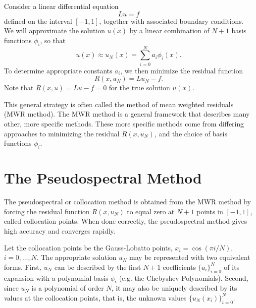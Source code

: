 \label{lab:pseudospectral1_revision}

Consider a linear differential equation
\begin{equation*}
	Lu = f
\end{equation*}
defined on the interval $[-1,1]$, together with associated boundary conditions.
We will approximate the solution $u(x)$ by a linear combination of $N+1$ basis functions $\phi_i$, so that
\begin{equation*}
	u(x) \approx u_N(x) = \sum_{i=0}^N a_i \phi_i(x).
\end{equation*}
To determine appropriate constants $a_i$, we then minimize the residual function
\begin{equation*}
	R(x,u_N) = Lu_N - f.
\end{equation*}
Note that $R(x,u) = Lu - f = 0$ for the true solution $u(x)$.

This general strategy is often called the method of mean weighted residuals (MWR method). 
The MWR method is a general framework that describes many other, more specific methods. 
These more specific methods come from differing approaches to minimizing the residual $R(x,u_N)$, and the choice of basis functions $\phi_i$.


\section*{The Pseudospectral Method}
The pseudospectral or collocation method is obtained from the MWR method by forcing the residual function $R(x,u_N)$ to equal zero at $N+1$ points in $[-1,1]$, called collocation points.
When done correctly, the pseudospectral method gives high accuracy and converges rapidly.

Let the collocation points be the Gauss-Lobatto points, $x_i = \cos(\pi i /N)$, $ i = 0, \ldots, N$.
The appropriate solution $u_N$ may be represented with two equivalent forms.
First, $u_N$ can be described by the first $N + 1$ coefficients  $\{a_i\}_{i=0}^N$ of its expansion with a polynomial basis $\phi_i$ (e.g. the Chebyshev Polynomials).
Second, since $u_N$ is a polynomial of order $N$, it may also be uniquely described by its values at the collocation points, that is, the unknown values  $\{u_N(x_i)\}_{i=0}^N$.

